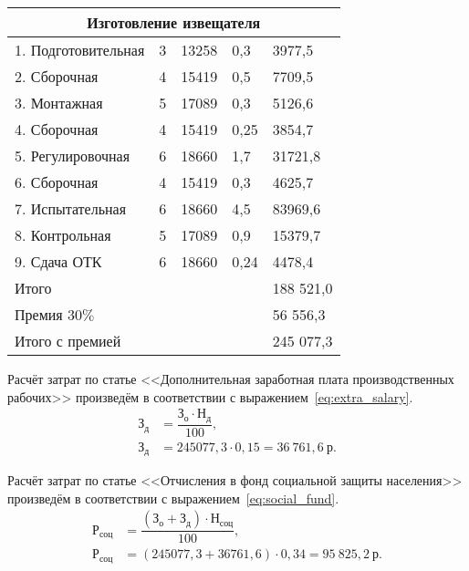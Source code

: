 \begin{table}[h!]
{\begin{tabular}{| p{} | p{} | p{} |
                      p{} | p{} |}
      \multicolumn{5}{|c|}{Изготовление извещателя} \\ \hline
      1. Подготовительная & 3 & 13258 & 0,3  & 3977,5  \\ \hline
      2. Сборочная        & 4 & 15419 & 0,5  & 7709,5  \\ \hline
      3. Монтажная        & 5 & 17089 & 0,3  & 5126,6  \\ \hline
      4. Сборочная        & 4 & 15419 & 0,25 & 3854,7  \\ \hline
      5. Регулировочная   & 6 & 18660 & 1,7  & 31721,8 \\ \hline
      6. Сборочная        & 4 & 15419 & 0,3  & 4625,7  \\ \hline
      7. Испытательная    & 6 & 18660 & 4,5  & 83969,6 \\ \hline
      8. Контрольная      & 5 & 17089 & 0,9  & 15379,7 \\ \hline
      9. Сдача ОТК        & 6 & 18660 & 0,24 & 4478,4  \\ \hline

      Итого               & & & & 188 521,0            \\ \hline
      Премия $30\%$       & & & & 56 556,3             \\ \hline
      Итого с премией     & & & & 245 077,3            \\ \hline

    \end{tabular}
  }
\end{table}

\newpage

Расчёт затрат по статье <<Дополнительная заработная плата производственных
рабочих>> произведём в соответствии с выражением~\ref{eq:extra_salary}.
\begin{align}
  \label{eq:extra_salary}
  \text{З}_{\text{д}} &= \dfrac{\text{З}_{\text{о}} \cdot
    \text{Н}_{\text{д}}}{100}, \\
  \text{З}_{\text{д}} &= 245077{,}3 \cdot 0{,}15 =
    36~761{,}6 \: \text{р.} \nonumber
\end{align}

Расчёт затрат по статье <<Отчисления в фонд социальной защиты населения>>
произведём в соответствии с выражением~\ref{eq:social_fund}.
\begin{align}
  \label{eq:social_fund}
  \text{Р}_{\text{соц}} &= \dfrac{(\text{З}_{\text{о}} + \text{З}_{\text{д}}) \cdot
    \text{Н}_{\text{соц}}}{100}, \\
  \text{Р}_{\text{соц}} &= (245077{,}3 + 36761{,}6) \cdot 0{,}34 =
    95~825{,}2 \: \text{р.} \nonumber
\end{align}

